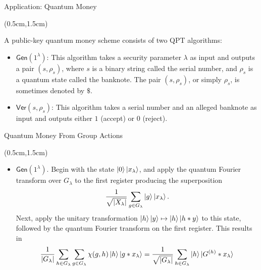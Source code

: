\documentclass{beamer}
\theoremstyle{definition}
\newcommand{\gen}{\mathsf{Gen}}
\newcommand{\ver}{\mathsf{Ver}}
\begin{document}
\begin{frame}{Application: Quantum Money}
    
    \begin{textblock*}{12cm}(0.5cm,1.5cm)
            
        A public-key quantum money scheme consists of two QPT algorithms:
        \vspace{1cm} 
        \begin{itemize}
        \item $\gen(1^\lambda)$: This algorithm takes a security parameter $\lambda$ as input and outputs a pair $(s, \rho_s)$, where $s$ is a binary string called the serial number, and $\rho_s$ is a quantum state called the banknote. The pair $(s, \rho_s)$, or simply $\rho_s$, is sometimes denoted by $\$$.
        
        \vspace{1cm}
        \item $\ver(s, \rho_s)$: This algorithm takes a serial number and an alleged banknote as input and outputs either $1$ (accept) or $0$ (reject).
        \end{itemize}

    \end{textblock*}


\end{frame}





\begin{frame}{Quantum Money From Group Actions}
    
    \begin{textblock*}{12cm}(0.5cm,1.5cm)
            
        
        \begin{itemize}
        \item $\gen(1^\lambda)$. Begin with the state $\ket{0}\ket{x_\lambda}$, and apply the quantum Fourier transform over $G_\lambda$ to the first register producing the superposition
        \[ \frac{1}{\sqrt{{|X_\lambda|}}} \sum_{g \in G_\lambda} \ket{g}\ket{x_\lambda}. \]
        Next, apply the unitary transformation $\ket{h}\ket{y} \mapsto \ket{h}\ket{h * y}$ to this state, followed by the quantum Fourier transform on the first register. This results in
        \[ \frac{1}{{|G_\lambda|}} \sum_{h \in G_\lambda} \sum_{g \in G_\lambda} \chi(g, h) \ket{h}\ket{g * x_\lambda} = \frac{1}{\sqrt{{|G_\lambda|}}} \sum_{h \in G_\lambda} \ket{h} \ket{G^{(h)} * x_\lambda} \]

        \end{itemize}

        
    \end{textblock*}


\end{frame}
\end{document}
